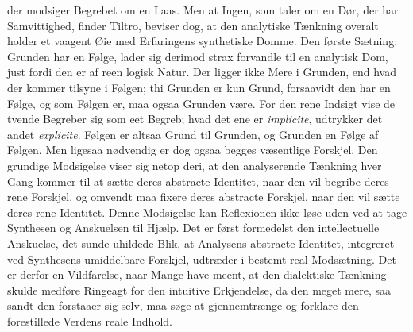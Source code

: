 \documentclass[12pt]{book}
\newcommand{\opage}[1]{\marginnote{\footnotesize\textit{[#1]}}}
\begin{document}
der modsiger Begrebet om en Laas. Men at Ingen, som taler om en Dør, der har
Samvittighed, finder Tiltro, beviser dog, at den analytiske Tænkning overalt
holder et vaagent Øie med Erfaringens synthetiske Domme. Den første Sætning:
Grunden har en Følge, lader sig derimod strax forvandle til en analytisk Dom, just
fordi den er af reen logisk Natur. Der ligger ikke Mere
\opage{58} i Grunden, end hvad der kommer tilsyne i Følgen; thi Grunden er kun Grund,
forsaavidt den har en Følge, og som Følgen er, maa ogsaa Grunden være. For den
rene Indsigt vise de tvende Begreber sig som eet Begreb; hvad det ene er
\textit{implicite}, udtrykker det andet \textit{explicite}. Følgen er altsaa Grund
til Grunden, og Grunden en Følge af Følgen. Men ligesaa nødvendig er dog ogsaa
begges væsentlige Forskjel. Den grundige Modsigelse viser sig netop deri, at den
analyserende Tænkning hver Gang kommer til at sætte deres abstracte Identitet,
naar den vil begribe deres rene Forskjel, og omvendt maa fixere deres abstracte
Forskjel, naar den vil sætte deres rene Identitet. Denne Modsigelse kan
Reflexionen ikke løse uden ved at tage Synthesen og Anskuelsen til Hjælp. Det er
først formedelst den intellectuelle Anskuelse, det sunde uhildede Blik, at
Analysens abstracte Identitet, integreret ved Synthesens umiddelbare Forskjel,
udtræder i bestemt real Modsætning. Det er derfor en Vildfarelse, naar Mange have
meent, at den dialektiske Tænkning skulde medføre Ringeagt for den intuitive
Erkjendelse, da den meget mere, saa sandt den forstaaer sig selv, maa søge at
gjennemtrænge og forklare den forestillede Verdens reale Indhold.
\end{document}
